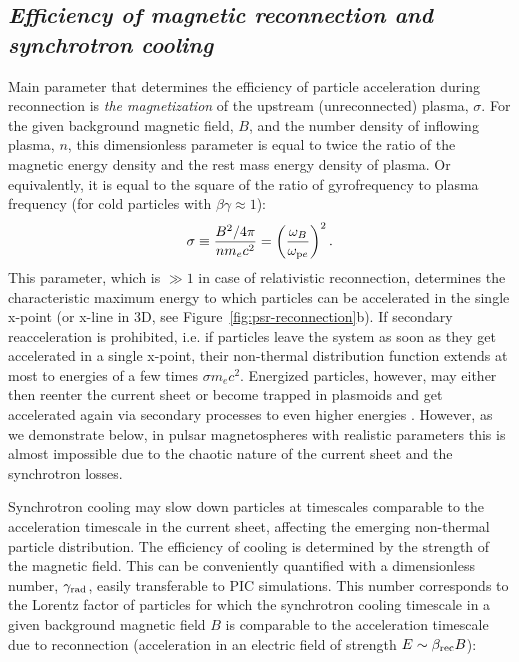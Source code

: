 \subsection*{\small\it Efficiency of magnetic reconnection and synchrotron cooling}

Main parameter that determines the efficiency of particle acceleration during reconnection is \emph{the magnetization} of the upstream (unreconnected) plasma, $\sigma$. For the given background magnetic field, $B$, and the number density of inflowing plasma, $n$, this dimensionless parameter is equal to twice the ratio of the magnetic energy density and the rest mass energy density of plasma. Or equivalently, it is equal to the square of the ratio of gyrofrequency to plasma frequency (for cold particles with $\beta\gamma\approx 1$):
\begin{equation}
    \sigma \equiv \frac{B^2/4\pi}{n m_e c^2} = \left(\frac{\omega_{B}}{\omega_{{\rm p}e}}\right)^2.
\end{equation}
\noindent This parameter, which is $\gg 1$ in case of relativistic reconnection, determines the characteristic maximum energy to which particles can be accelerated in the single x-point (or x-line in 3D, see Figure~\ref{fig:psr-reconnection}b). If secondary reacceleration is prohibited, i.e. if particles leave the system as soon as they get accelerated in a single x-point, their non-thermal distribution function extends at most to energies of a few times $\sigma m_e c^2$. Energized particles, however, may either then reenter the current sheet or become trapped in plasmoids and get accelerated again via secondary processes to even higher energies \citep{2018MNRAS.481.5687P,2021ApJ...912...48H}. However, as we demonstrate below, in pulsar magnetospheres with realistic parameters this is almost impossible due to the chaotic nature of the current sheet and the synchrotron losses. 

Synchrotron cooling may slow down particles at timescales comparable to the acceleration timescale in the current sheet, affecting the emerging non-thermal particle distribution. The efficiency of cooling is determined by the strength of the magnetic field. This can be conveniently quantified with a dimensionless number, $\gamma_{\rm rad}$, easily transferable to PIC simulations. This number corresponds to the Lorentz factor of particles for which the synchrotron cooling timescale in a given background magnetic field $B$ is comparable to the acceleration timescale due to reconnection (acceleration in an electric field of strength $E\sim \beta_{\rm rec}B$):

